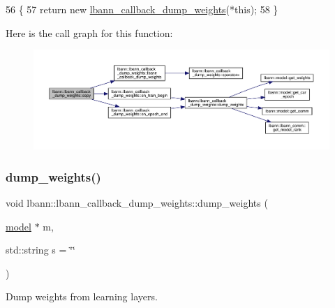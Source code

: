 \begin{DoxyCode}
56                                                      \{
57     \textcolor{keywordflow}{return} \textcolor{keyword}{new} \hyperlink{classlbann_1_1lbann__callback__dump__weights_a6ad86c6dec233324f013e9d83e574267}{lbann\_callback\_dump\_weights}(*\textcolor{keyword}{this});
58   \}
\end{DoxyCode}
Here is the call graph for this function\+:\nopagebreak
\begin{figure}[H]
\begin{center}
\leavevmode
\includegraphics[width=350pt]{classlbann_1_1lbann__callback__dump__weights_a5e3d078ea54f8768e23aac2393b1bc3c_cgraph}
\end{center}
\end{figure}
\mbox{\label{classlbann_1_1lbann__callback__dump__weights_a5902fb87255b410a5d777ea385813416}} 
\subsubsection{\texorpdfstring{dump\+\_\+weights()}{dump\_weights()}}
{\footnotesize\ttfamily void lbann\+::lbann\+\_\+callback\+\_\+dump\+\_\+weights\+::dump\+\_\+weights (\begin{DoxyParamCaption}\item[{\hyperlink{classlbann_1_1model}{model} $\ast$}]{m,  }\item[{std\+::string}]{s = {\ttfamily \char`\"{}\char`\"{}} }\end{DoxyParamCaption})\hspace{0.3cm}{\ttfamily [private]}}



Dump weights from learning layers. 



